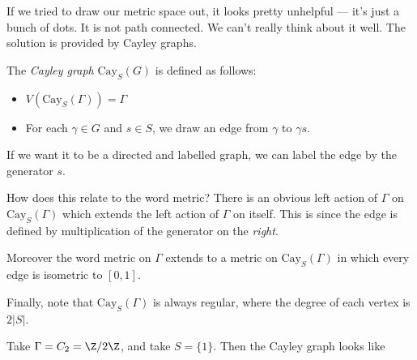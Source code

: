\documentclass[a4paper]{article}
\newcommand\Cay{\mathrm{Cay}}
\begin{document}
If we tried to draw our metric space out, it looks pretty unhelpful --- it's just a bunch of dots. It is not path connected. We can't really think about it well. The solution is provided by Cayley graphs.

\begin{defi}
  The \emph{Cayley graph} $\Cay_S(G)$ is defined as follows:
  \begin{itemize}
    \item $V(\Cay_S(\Gamma)) = \Gamma$
    \item For each $\gamma \in G$ and $s \in S$, we draw an edge from $\gamma$ to $\gamma s$.
  \end{itemize}
\end{defi}
If we want it to be a directed and labelled graph, we can label the edge by the generator $s$.

How does this relate to the word metric? There is an obvious left action of $\Gamma$ on $\Cay_S(\Gamma)$ which extends the left action of $\Gamma$ on itself. This is since the edge is defined by multiplication of the generator on the \emph{right}.

Moreover the word metric on $\Gamma$ extends to a metric on $\Cay_S(\Gamma)$ in which every edge is isometric to $[0, 1]$.

Finally, note that $\Cay_S(\Gamma)$ is always regular, where the degree of each vertex is $2|S|$.

\begin{eg}
  Take $\Gamma = C_2 = \Z/2\Z$, and take $S = \{1\}$. Then the Cayley graph looks like
  \begin{center}
  \end{center}
\end{eg}
\end{document}
